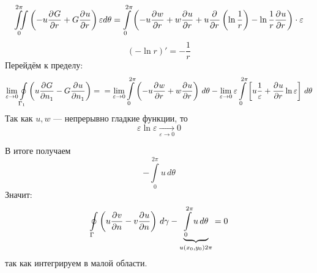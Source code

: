 \[
	\iint\limits_0^{2\pi} \left( - u \frac{\partial^{}G}{\partial r^{}} + G \frac{\partial^{}u}{\partial r^{}} \right) \varepsilon d\theta = \int\limits_0^{2\pi} \left(- u \frac{\partial^{}w}{\partial r^{}} + w \frac{\partial^{}u}{\partial r^{}} + u \frac{\partial^{}}{\partial r^{}} \left(\ln \frac{1}{r} \right) - \ln \frac{1}{r} \frac{\partial^{}u}{\partial r^{}}\right) \cdot \varepsilon
\]
\[
	(- \ln r )' = - \frac{1}{r}
\]
Перейдём к пределу:
\[
	\lim\limits_{\varepsilon \to 0} \oint\limits_{\Gamma_1} \left(u \frac{\partial^{}G}{\partial n_1^{}} - G \frac{\partial^{}u}{\partial n_1^{}} \right) = \\ 
	=	\lim\limits_{\varepsilon \to 0} \int\limits_0^{2 \pi} \left(- u \frac{\partial^{}w}{\partial r^{}} + w \frac{\partial^{}u}{\partial r^{}} \right)\, d\theta - \lim\limits_{\varepsilon \to 0} \varepsilon \int\limits_0^{2 \pi} \left[u \frac{1}{\varepsilon}  + \frac{\partial^{}u}{\partial r^{}} \ln \varepsilon\right]\, d\theta  
\]
Так как $u, w$ --- непрерывно гладкие функции, то
\[
	\varepsilon \ln \varepsilon \underset{\varepsilon \to 0}{\to} 0
\]

В итоге получаем 
\[
	- \int\limits_0^{2 \pi} u \, d \theta
\]
Значит:
\[
	\oint\limits_\Gamma \left(u \frac{\partial^{}v}{\partial n^{}} - v \frac{\partial^{}u}{\partial n^{}} \right)\, d\gamma - \underbrace{\int\limits_0^{2 \pi} u\, d \theta}_{u(x_0, y_0) 2 \pi} = 0
\]
так как интегрируем в малой области.
